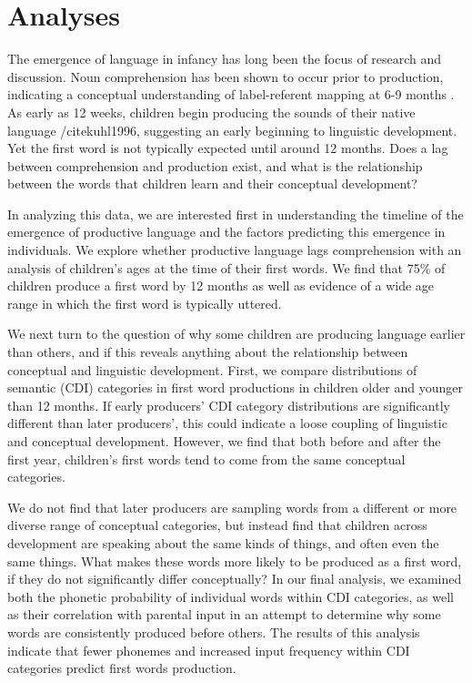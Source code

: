 \documentclass[10pt,letterpaper]{article}
\begin{document}
\section{Analyses}
The emergence of language in infancy has long been the focus of research and discussion. Noun comprehension has been shown to occur prior to production, indicating a conceptual understanding of label-referent mapping at 6-9 months \cite{tincoff1999,tincoff2012,bergelson2012}. As early as 12 weeks, children begin producing the sounds of their native language /cite{kuhl1996}, suggesting an early beginning to linguistic development. Yet the first word is not typically expected until around 12 months. Does a lag between comprehension and production exist, and what is the relationship between the words that children learn and their conceptual development? 

In analyzing this data, we are interested first in understanding the timeline of the emergence of productive language and the factors predicting this emergence in individuals. We explore whether productive language lags comprehension with an analysis of children's ages at the time of their first words. We find that 75\% of children produce a first word by 12 months as well as evidence of a wide age range in which the first word is typically uttered.

We next turn to the question of why some children are producing language earlier than others, and if this reveals anything about the relationship between conceptual and linguistic development. First, we compare distributions of semantic (CDI) categories in first word productions in children older and younger than 12 months. If early producers' CDI category distributions are significantly different than later producers', this could indicate a loose coupling of linguistic and conceptual development. However, we find that both before and after the first year, children's first words tend to come from the same conceptual categories.

We do not find that later producers are sampling words from a different or more diverse range of conceptual categories, but instead find that children across development are speaking about the same kinds of things, and often even the same things. What makes these words more likely to be produced as a first word, if they do not significantly differ conceptually? In our final analysis, we examined both the phonetic probability of individual words within CDI categories, as well as their correlation with parental input in an attempt to determine why some words are consistently produced before others. The results of this analysis indicate that fewer phonemes and increased input frequency within CDI categories predict first words production.
\end{document}
